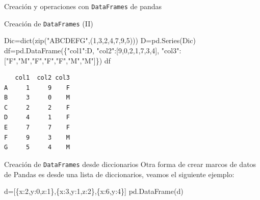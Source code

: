 \documentclass[
  ignorenonframetext,
  aspectratio=169,
  spanish,
]{beamer}
\newenvironment{Shaded}{\begin{snugshade}}{\end{snugshade}}
\newcommand{\BuiltInTok}[1]{\textcolor[rgb]{0.00,0.23,0.31}{#1}}
\newcommand{\DecValTok}[1]{\textcolor[rgb]{0.68,0.00,0.00}{#1}}
\newcommand{\NormalTok}[1]{\textcolor[rgb]{0.00,0.23,0.31}{#1}}
\newcommand{\OperatorTok}[1]{\textcolor[rgb]{0.37,0.37,0.37}{#1}}
\newcommand{\StringTok}[1]{\textcolor[rgb]{0.13,0.47,0.30}{#1}}
\newcommand*\circled[1]{\tikz[baseline=(char.base)]{
          \node[shape=circle,draw,inner sep=1pt] (char) {{\scriptsize#1}};}}
\begin{document}
\begin{frame}[fragile]{Creación y operaciones con \texttt{DataFrames} de
pandas}
\begin{block}{Creación de \texttt{DataFrames} (II)}
\begin{Shaded}
\begin{Highlighting}[numbers=left,,]
\NormalTok{Dic}\OperatorTok{=}\BuiltInTok{dict}\NormalTok{(}\BuiltInTok{zip}\NormalTok{(}\StringTok{"ABCDEFG"}\NormalTok{,(}\DecValTok{1}\NormalTok{,}\DecValTok{3}\NormalTok{,}\DecValTok{2}\NormalTok{,}\DecValTok{4}\NormalTok{,}\DecValTok{7}\NormalTok{,}\DecValTok{9}\NormalTok{,}\DecValTok{5}\NormalTok{)))}
\NormalTok{D}\OperatorTok{=}\NormalTok{pd.Series(Dic) }
\NormalTok{df}\OperatorTok{=}\NormalTok{pd.DataFrame(\{}\StringTok{"col1"}\NormalTok{:D,}
                \StringTok{"col2"}\NormalTok{:[}\DecValTok{9}\NormalTok{,}\DecValTok{0}\NormalTok{,}\DecValTok{2}\NormalTok{,}\DecValTok{1}\NormalTok{,}\DecValTok{7}\NormalTok{,}\DecValTok{3}\NormalTok{,}\DecValTok{4}\NormalTok{],}
            \StringTok{"col3"}\NormalTok{:[}\StringTok{"F"}\NormalTok{,}\StringTok{"M"}\NormalTok{,}\StringTok{"F"}\NormalTok{,}\StringTok{"F"}\NormalTok{,}\StringTok{"F"}\NormalTok{,}\StringTok{"M"}\NormalTok{,}\StringTok{"M"}\NormalTok{]\})}
\NormalTok{df}
\end{Highlighting}
\end{Shaded}

\begin{verbatim}
   col1  col2 col3
A     1     9    F
B     3     0    M
C     2     2    F
D     4     1    F
E     7     7    F
F     9     3    M
G     5     4    M
\end{verbatim}
\end{block}

\begin{block}{Creación de \texttt{DataFrames} desde diccionarios}
\label{creaciuxf3n-de-dataframes-desde-diccionarios}
Otra forma de crear marcos de datos de Pandas es desde una lista de
diccionarios, veamos el siguiente ejemplo:

\label{annotated-cell-4}%
\begin{Shaded}
\begin{Highlighting}[]
\NormalTok{d}\OperatorTok{=}\NormalTok{[\{}\StringTok{\textquotesingle{}x\textquotesingle{}}\NormalTok{:}\DecValTok{2}\NormalTok{,}\StringTok{\textquotesingle{}y\textquotesingle{}}\NormalTok{:}\DecValTok{0}\NormalTok{,}\StringTok{\textquotesingle{}z\textquotesingle{}}\NormalTok{:}\DecValTok{1}\NormalTok{\},\{}\StringTok{\textquotesingle{}x\textquotesingle{}}\NormalTok{:}\DecValTok{3}\NormalTok{,}\StringTok{\textquotesingle{}y\textquotesingle{}}\NormalTok{:}\DecValTok{1}\NormalTok{,}\StringTok{\textquotesingle{}z\textquotesingle{}}\NormalTok{:}\DecValTok{2}\NormalTok{\},\{}\StringTok{\textquotesingle{}x\textquotesingle{}}\NormalTok{:}\DecValTok{6}\NormalTok{,}\StringTok{\textquotesingle{}y\textquotesingle{}}\NormalTok{:}\DecValTok{4}\NormalTok{\}] }\hspace*{\fill}\NormalTok{\circled{1}}
\NormalTok{pd.DataFrame(d) }\hspace*{\fill}\NormalTok{\circled{2}}
\end{Highlighting}
\end{Shaded}


\end{block}
\end{frame}
\end{document}
